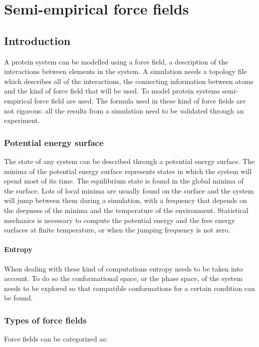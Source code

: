 \graphicspath{{chapters/03/images/}}
\chapter{Semi-empirical force fields}

\section{Introduction}
A protein system can be modelled using a force field, a description of the interactions between elements in the system.
A simulation needs a topology file which describes all of the interactions, the connecting information between atoms and the kind of force field that will be used.
To model protein systems semi-empirical force field are used.
The formula used in these kind of force fields are not rigorous: all the results from a simulation need to be validated through an experiment.

	\subsection{Potential energy surface}
	The state of any system can be described through a potential energy surface.
	The minima of the potential energy surface represents states in which the system will spend most of its time.
	The equilibrium state is found in the global minima of the surface.
	Lots of local minima are usually found on the surface and the system will jump between them during a simulation, with a frequency that depends on the deepness of the minima and the temperature of the environment.
	Statistical mechanics is necessary to compute the potential energy and the free energy surfaces at finite temperature, or when the jumping frequency is not zero.

		\subsubsection{Entropy}
		When dealing with these kind of computations entropy needs to be taken into account.
		To do so the conformational space, or the phase space, of the system needs to be explored so that compatible conformations for a certain condition can be found.

	\subsection{Types of force fields}
	Force fields can be categorized as:

